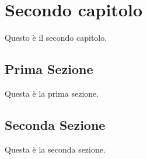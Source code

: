 \clearpage{\pagestyle{empty}\cleardoublepage}
\chapter{Secondo capitolo}                %

Questo \`e il secondo capitolo.
\section{Prima Sezione}                 %
Questa \`e la prima sezione.

\section{Seconda Sezione}                 %
Questa \`e la seconda sezione.
